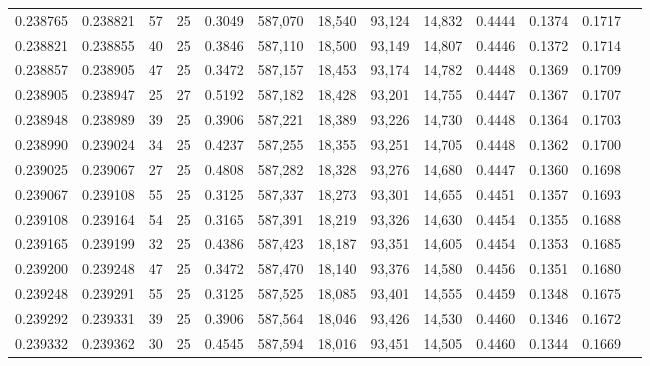 \begin{tabular}{rrrrrrrrrrrrr}
0.238765 & 0.238821 &    57 &  25 &                                     0.3049 & 587,070 &  18,540 &  93,124 &  14,832 & 0.4444 & 0.1374 & 0.1717 \\
0.238821 & 0.238855 &    40 &  25 &                                     0.3846 & 587,110 &  18,500 &  93,149 &  14,807 & 0.4446 & 0.1372 & 0.1714 \\
0.238857 & 0.238905 &    47 &  25 &                                     0.3472 & 587,157 &  18,453 &  93,174 &  14,782 & 0.4448 & 0.1369 & 0.1709 \\
0.238905 & 0.238947 &    25 &  27 &                                     0.5192 & 587,182 &  18,428 &  93,201 &  14,755 & 0.4447 & 0.1367 & 0.1707 \\
0.238948 & 0.238989 &    39 &  25 &                                     0.3906 & 587,221 &  18,389 &  93,226 &  14,730 & 0.4448 & 0.1364 & 0.1703 \\
0.238990 & 0.239024 &    34 &  25 &                                     0.4237 & 587,255 &  18,355 &  93,251 &  14,705 & 0.4448 & 0.1362 & 0.1700 \\
0.239025 & 0.239067 &    27 &  25 &                                     0.4808 & 587,282 &  18,328 &  93,276 &  14,680 & 0.4447 & 0.1360 & 0.1698 \\
0.239067 & 0.239108 &    55 &  25 &                                     0.3125 & 587,337 &  18,273 &  93,301 &  14,655 & 0.4451 & 0.1357 & 0.1693 \\
0.239108 & 0.239164 &    54 &  25 &                                     0.3165 & 587,391 &  18,219 &  93,326 &  14,630 & 0.4454 & 0.1355 & 0.1688 \\
0.239165 & 0.239199 &    32 &  25 &                                     0.4386 & 587,423 &  18,187 &  93,351 &  14,605 & 0.4454 & 0.1353 & 0.1685 \\
0.239200 & 0.239248 &    47 &  25 &                                     0.3472 & 587,470 &  18,140 &  93,376 &  14,580 & 0.4456 & 0.1351 & 0.1680 \\
0.239248 & 0.239291 &    55 &  25 &                                     0.3125 & 587,525 &  18,085 &  93,401 &  14,555 & 0.4459 & 0.1348 & 0.1675 \\
0.239292 & 0.239331 &    39 &  25 &                                     0.3906 & 587,564 &  18,046 &  93,426 &  14,530 & 0.4460 & 0.1346 & 0.1672 \\
0.239332 & 0.239362 &    30 &  25 &                                     0.4545 & 587,594 &  18,016 &  93,451 &  14,505 & 0.4460 & 0.1344 & 0.1669 \\

\end{tabular}
